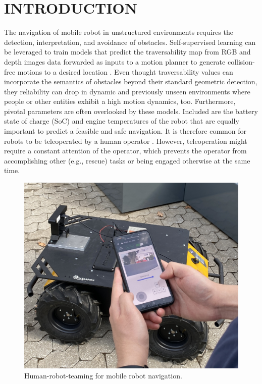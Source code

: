 \documentclass[letterpaper, 10 pt, conference]{ieeeconf}  %
\begin{document}
\section{INTRODUCTION}
The navigation of mobile robot in unstructured environments requires the detection, interpretation, and avoidance of obstacles.  
Self-supervised learning can be leveraged to train  models that predict the traversability map from RGB and depth images data forwarded as inputs to a motion planner to generate collision-free motions to a desired location \cite{wayfaster,wayfast,leung2022hybrid,endo2024benchnav}. 
Even thought traversability values can incorporate the semantics of obstacles beyond their standard geometric detection, they reliability can drop in dynamic and previously unseen environments \cite{frey2024roadrunner,muhamad2024robust} where people or other entities exhibit a high motion dynamics, too. Furthermore, pivotal parameters are often overlooked by these models. Included are the battery state of charge (SoC) and engine temperatures of the robot that are equally important to predict a feasible and safe navigation. It is therefore common for robots to be  teleoperated by a human operator \cite{huang2024evaluation,husky}. However, teleoperation might require a constant attention of the operator, which prevents the operator from accomplishing other (e.g., rescue) tasks or being engaged otherwise at the same time.


\begin{figure}[t]
	\centerline{\includegraphics[width=0.95\columnwidth]{images/galaxycontrol.jpg}}
	\caption{Human-robot-teaming for mobile robot navigation.}
	\label{fig:galaxycontrol}
\end{figure}
\end{document}

